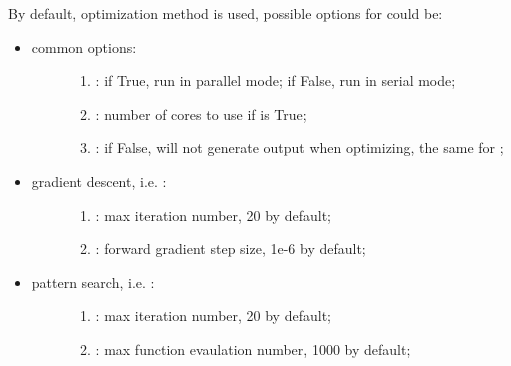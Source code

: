 \documentclass[letterpaper,10pt,english]{sphinxmanual}
\begin{document}
By default,  optimization method is used, possible options
for  could be:
\begin{itemize}
\item {} \begin{description}
\item[{common options:}] \leavevmode\begin{enumerate}
\item {} 
: if True, run in parallel mode; if False, run in serial mode;

\item {} 
: number of cores to use if  is True;

\item {} 
: if False, will not generate output when optimizing, the same for ;

\end{enumerate}

\end{description}

\item {} \begin{description}
\item[{gradient descent, i.e. :}] \leavevmode\begin{enumerate}
\item {} 
: max iteration number, 20 by default;

\item {} 
: forward gradient step size, 1e-6 by default;

\end{enumerate}

\end{description}

\item {} \begin{description}
\item[{pattern search, i.e. :}] \leavevmode\begin{enumerate}
\item {} 
: max iteration number, 20 by default;

\item {} 
: max function evaulation number, 1000 by default;

\end{enumerate}

\end{description}

\end{itemize}
\end{document}
